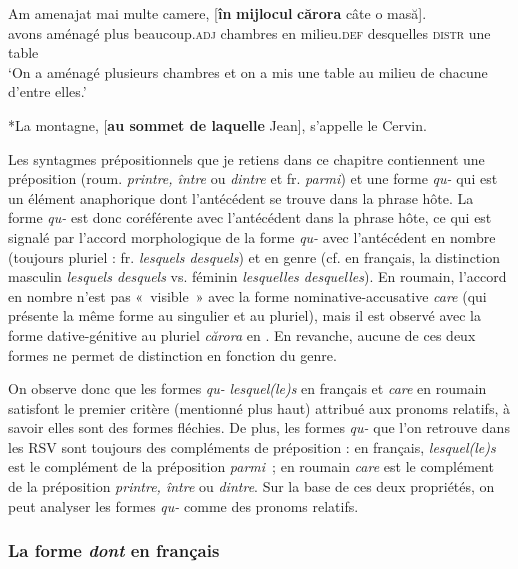 \ea\label{ch3:ex14}
\gll *Am  amenajat  mai  multe  camere,  [\textbf{în} \textbf{mijlocul} \textbf{cărora} câte o masă].\\
avons  aménagé  plus  beaucoup.\textsc{adj}  chambres  en  milieu.\textsc{def} desquelles \textsc{distr} une  table\\
\glt ‘On a aménagé plusieurs chambres et on a mis une table au milieu de chacune d’entre elles.’
\z

\ea\label{ch3:ex15}
 *La montagne, [\textbf{au sommet de laquelle} Jean], s’appelle le Cervin.
\z

Les syntagmes prépositionnels que je retiens dans ce chapitre contiennent une préposition (roum. \textit{printre, între} ou \textit{dintre} et fr. \textit{parmi}) et une forme \textit{qu-} qui est un élément anaphorique dont l’antécédent se trouve dans la phrase hôte. La forme \textit{qu-} est donc coréférente avec l’antécédent dans la phrase hôte, ce qui est signalé par l’accord morphologique de la forme \textit{qu-} avec l’antécédent en nombre (toujours pluriel : fr. \textit{lesquels {\textbar} desquels}) et en genre (cf. en français, la distinction masculin \textit{lesquels {\textbar} desquels} vs. féminin \textit{lesquelles {\textbar} desquelles}). En roumain, l’accord en nombre n’est pas «~visible~» avec la forme nominative-accusative \textit{care} (qui présente la même forme au singulier et au pluriel), mais il est observé avec la forme dative-génitive au pluriel \textit{cărora} en . En revanche, aucune de ces deux formes ne permet de distinction en fonction du genre.


On observe donc que les formes \textit{qu-} \textit{lesquel(le)s} en français et \textit{care} en roumain satisfont le premier critère (mentionné plus haut) attribué aux pronoms relatifs, à savoir elles sont des formes fléchies. De plus, les formes \textit{qu-} que l’on retrouve dans les RSV sont toujours des compléments de préposition : en français, \textit{lesquel(le)s} est le complément de la préposition \textit{parmi}~; en roumain \textit{care} est le complément de la préposition \textit{printre, între} ou \textit{dintre}. Sur la base de ces deux propriétés, on peut analyser les formes \textit{qu-} comme des pronoms relatifs.  


\subsubsection{La forme \textit{dont} en français}\label{ch3:sect3.2.1.2}

